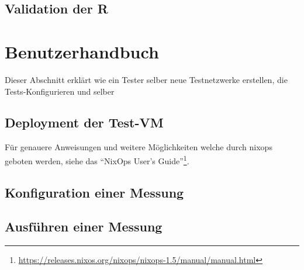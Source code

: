 \subsection{Validation der R}

\section{Benutzerhandbuch}

Dieser Abschnitt erklärt wie ein Tester selber neue Testnetzwerke erstellen, die Tests-Konfigurieren und selber

\subsection{Deployment der Test-VM}

Für genauere Anweisungen und weitere Möglichkeiten welche durch nixops geboten werden, siehe das ``NixOps User's Guide''\footnote{\url{https://releases.nixos.org/nixops/nixops-1.5/manual/manual.html}}.


\subsection{Konfiguration einer Messung}

\subsection{Ausführen einer Messung}
